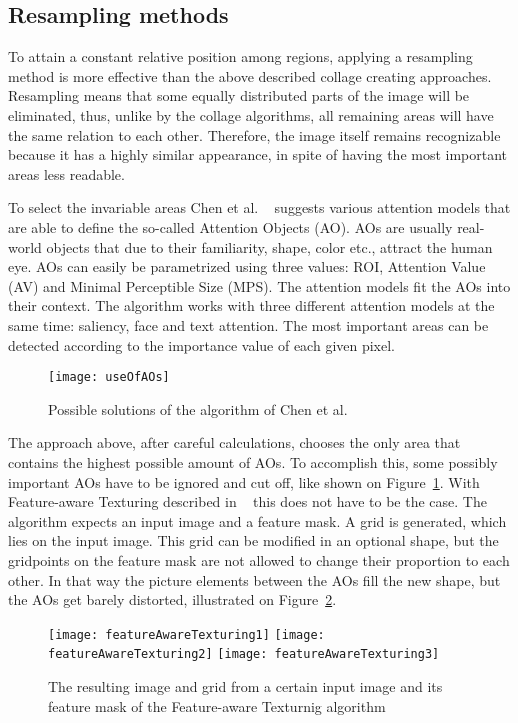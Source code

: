 \documentclass[draft,final]{vutinfth} %
\begin{document}
	\subsection{Resampling methods}
	To attain a constant relative position among regions, applying a resampling method is more effective than the above described collage creating approaches.
	Resampling means that some equally distributed parts of the image will be eliminated, thus, unlike by the collage algorithms, all remaining areas will have the same relation to each other.
	Therefore, the image itself remains recognizable because it has a highly similar appearance, in spite of having the most important areas less readable.\par 
	To select the invariable areas Chen et al. ~\cite{chen2003visual} suggests various attention models that are able to define the so-called Attention Objects (AO).
	AOs are usually real-world objects that due to their familiarity, shape, color etc., attract the human eye.
	AOs can easily be parametrized using three values: ROI, Attention Value (AV) and Minimal Perceptible Size (MPS).
	The attention models fit the AOs into their context.
	The algorithm works with three different attention models at the same time: saliency, face and text attention.
	The most important areas can be detected according to the importance value of each given pixel.\par 
	\begin{figure}[h]
		\centering		
		\texttt{[image: useOfAOs]}
		\caption{Possible solutions of the algorithm of Chen et al. ~\cite{chen2003visual}}
		\label{fig:useOfAOs}
	\end{figure}
	The approach above, after careful calculations, chooses the only area that contains the highest possible amount of AOs.
	To accomplish this, some possibly important AOs have to be ignored and cut off, like shown on Figure~\ref{fig:useOfAOs}.
	With Feature-aware Texturing described in ~\cite{gal2006feature} this does not have to be the case.
	The algorithm expects an input image and a feature mask.
	A grid is generated, which lies on the input image.
	This grid can be modified in an optional shape, but the gridpoints on the feature mask are not allowed to change their proportion to each other.
	In that way the picture elements between the AOs fill the new shape, but the AOs get barely distorted, illustrated on Figure~\ref{fig:fat}.\par 
	 \begin{figure}[h]
		\texttt{[image: featureAwareTexturing1]}\hfill
		\texttt{[image: featureAwareTexturing2]}\hfill
		\texttt{[image: featureAwareTexturing3]}
		\caption{The resulting image and grid from a certain input image and its feature mask of the Feature-aware Texturnig algorithm ~\cite{gal2006feature} }
		\label{fig:fat}
	\end{figure}
\end{document}
